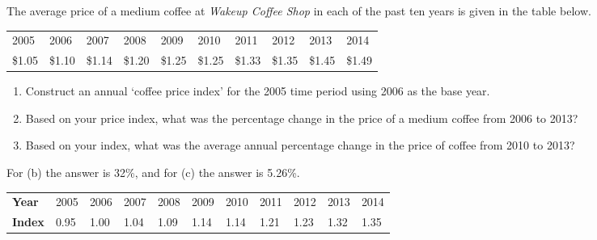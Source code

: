 \begin{enumialphparenastyle}
\begin{ex}\label{ex:ch2ex2}
The average price of a medium coffee at \textit{Wakeup Coffee Shop} in each of the past ten years is given in the table below.
\begin{center}
\begin{tabu} to \linewidth {|X[1,c]X[1,c]X[1,c]X[1,c]X[1,c]X[1,c]X[1,c]X[1,c]X[1,c]X[1,c]|}	\hline
{}	2005	&	2006	&	2007	&	2008	&	2009	&	2010	&	2011	&	2012	&	2013	&	2014		\\
\$1.05	&	\$1.10	&	\$1.14	&	\$1.20	&	\$1.25	&	\$1.25	&	\$1.33	&	\$1.35	&	\$1.45	&	\$1.49	\\	\hline
\end{tabu}
\end{center}
\begin{enumerate}
	\item	Construct an annual `coffee price index' for the 2005 time period using 2006 as the base year.
	\item	Based on your price index, what was the percentage change in the price of a medium coffee from 2006 to 2013?
	\item	Based on your index, what was the average annual percentage change in the price of coffee from 2010 to 2013?
\end{enumerate}
\begin{sol}
	For (b) the answer is 32\%, and for (c) the answer is 5.26\%.
	\begin{center}
	\begin{tabu} to \linewidth {|X[1,c]X[1,c]X[1,c]X[1,c]X[1,c]X[1,c]X[1,c]X[1,c]X[1,c]X[1,c]X[1,c]|}\hline
	\textbf{Year} & 2005 & 2006 & 2007 & 2008 & 2009 & 2010 & 2011 & 2012 & 2013 & 2014 \\
	\textbf{Index}& 0.95 & 1.00 & 1.04 & 1.09 & 1.14 & 1.14 & 1.21 & 1.23 & 1.32 & 1.35 \\ \hline
	\end{tabu}
	\end{center}
\end{sol}
\end{ex}


\end{enumialphparenastyle}
